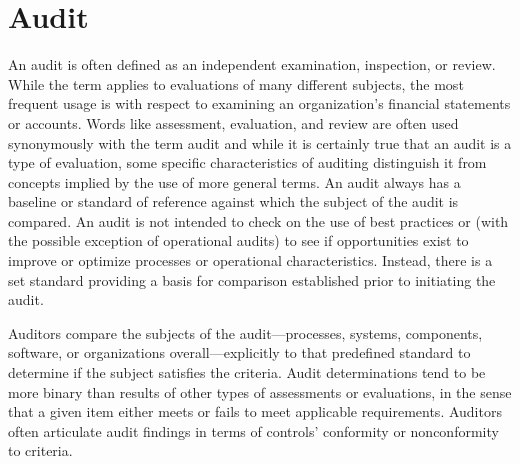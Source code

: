 %
\chapter{Audit}\label{chap:adt}


An audit is often defined as an independent examination, inspection, or review.
While the term applies to evaluations of many different subjects, the most frequent usage is with respect to examining an organization’s financial statements or accounts. Words like assessment, evaluation, and review are often used synonymously with the term audit and while it is certainly true that an audit is a type of
evaluation, some specific characteristics of auditing distinguish it from concepts
implied by the use of more general terms. An audit always has a baseline or standard of reference against which the subject of the audit is compared. An audit is not
intended to check on the use of best practices or (with the possible exception of
operational audits) to see if opportunities exist to improve or optimize processes
or operational characteristics. Instead, there is a set standard providing a basis for
comparison established prior to initiating the audit.

 Auditors compare the subjects of the audit—processes, systems, components, software, or organizations
overall—explicitly to that predefined standard to determine if the subject satisfies the criteria. Audit determinations tend to be more binary than results of other
types of assessments or evaluations, in the sense that a given item either meets or
fails to meet applicable requirements. Auditors often articulate audit findings in
terms of controls’ conformity or nonconformity to criteria.


